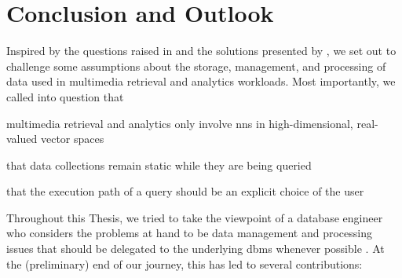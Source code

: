 \chapter{Conclusion and Outlook}
\label{chapter:conclusion}

Inspired by the questions raised in \cite{Jonsson:2016Ten} and the solutions presented by \cite{Giangreco:2018Database}, we set out to challenge some assumptions about the storage, management, and processing of data used in multimedia retrieval and analytics workloads. Most importantly, we called into question that 
\begin{enumerate*}[label=(\roman*), itemjoin={{, }}, itemjoin*={{, and }}, after={{.}}]
    \item multimedia retrieval and analytics only involve \acrshort{nns} in high-dimensional, real-valued vector spaces
    \item that data collections remain static while they are being queried
    \item that  the execution path of a query should be an explicit choice of the user
\end{enumerate*} 
Throughout this Thesis, we tried to take the viewpoint of a database engineer who considers the problems at hand to be data management and processing issues that should be delegated to the underlying \acrshort{dbms} whenever possible \cite{Ferro:2014Bridging,Amsaleg:2014Database}. At the (preliminary) end of our journey, this has led to several contributions:


